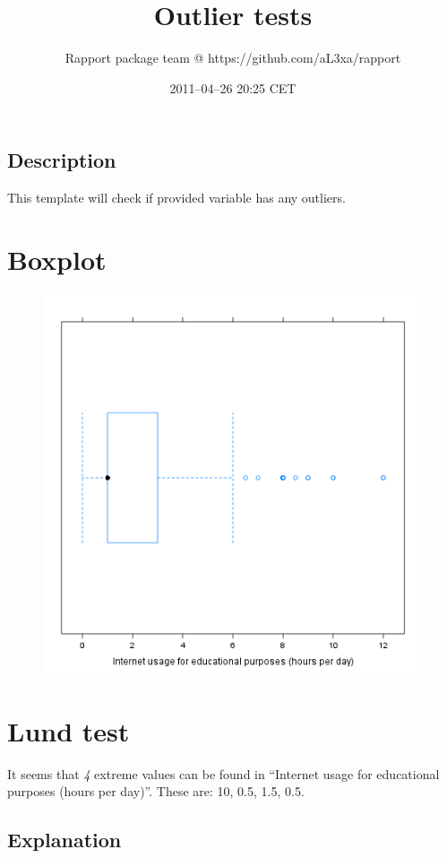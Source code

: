 \documentclass{article}
\title{Outlier tests}
\author{Rapport package team @ https://github.com/aL3xa/rapport}
\date{2011--04--26 20:25 CET}
\makeatletter
\def\maxwidth{\ifdim\Gin@nat@width>\linewidth\linewidth
\else\Gin@nat@width\fi}
\let\Oldincludegraphics\includegraphics
\renewcommand{\includegraphics}[1]{\Oldincludegraphics[width=\maxwidth]{#1}}
\makeatother
\begin{document}
\maketitle

\subsection{Description}

This template will check if provided variable has any outliers.

\section{Boxplot}

\begin{figure}[htbp]
\centering
\includegraphics{d24b3eb41da4d1de21d4bce0e30d2e1b.png}
\caption{}
\end{figure}

\section{Lund test}

It seems that \emph{4} extreme values can be found in ``Internet usage
for educational purposes (hours per day)''. These are: 10, 0.5, 1.5,
0.5.

\subsection{Explanation}
\end{document}
